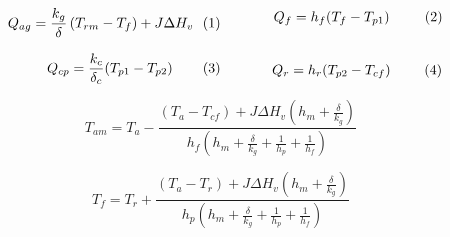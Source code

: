 \begin{subequations}
\noindent
\begin{minipage}{0.46\textwidth}
    \begin{equation}
        Q_{ag} = \dfrac{k_g}{\delta}
        \left( T_{rm} - T_f \right)
        + J \Delta H_v
        \label{eq: memb para film}
    \end{equation}
\end{minipage}%
\hfill
\begin{minipage}{0.46\textwidth}
    \begin{equation}
        Q_f = h_f (T_f - T_{p1})
        \label{eq: film para placa}
    \end{equation}
\end{minipage}
\end{subequations}

\vspace{3pt}

\begin{subequations}
\noindent
\begin{minipage}{0.46\textwidth}
    \begin{equation}
        Q_{cp} = \dfrac{k_c}{\delta_c}
        (T_{p1} - T_{p2})
        \label{eq: atrav placa}
    \end{equation}
\end{minipage}%
\hfill
\begin{minipage}{0.46\textwidth}
    \begin{equation}
        Q_r = h_r (T_{p2} - T_{cf})
        \label{eq: atrav resf}
    \end{equation}
\end{minipage}
\end{subequations}
\vspace{3pt}

\begin{equation}
    T_{am} = T_{a} - \dfrac{(T_{a} - T_{cf}) + J \Delta H_v \left( h_m + \tfrac{\delta}{k_g} \right)}
    {h_f \left( h_m + \tfrac{\delta}{k_g} + \tfrac{1}{h_p} + \tfrac{1}{h_f} \right)}
    \label{eq: temp sup alim}
\end{equation}

\vspace{3pt}

\begin{equation}
     T_{f} = T_{r} + \dfrac{(T_{a} - T_{r}) + J \Delta H_v \left( h_m + \tfrac{\delta}{k_g} \right)}
     {h_p \left( h_m + \tfrac{\delta}{k_g} + \tfrac{1}{h_p} + \tfrac{1}{h_f} \right)}
    \label{eq: temp film}
\end{equation} 


